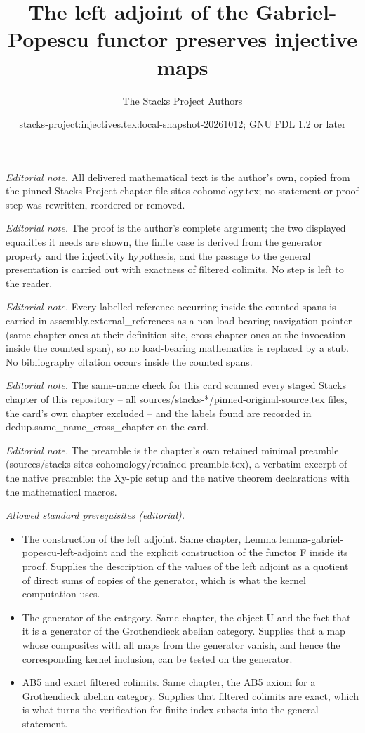 \documentclass[10pt,a4paper]{amsart}
\title{The left adjoint of the Gabriel-Popescu functor preserves injective maps}
\author{The Stacks Project Authors}
\date{stacks-project:injectives.tex:local-snapshot-20261012; GNU FDL 1.2 or later}
\theoremstyle{plain}
\theoremstyle{definition}
\theoremstyle{remark}
\numberwithin{equation}{subsection}
\begin{document}
\maketitle
\noindent\textit{Editorial note.} All delivered mathematical text is the author's own, copied from the pinned Stacks Project chapter file sites-cohomology.tex; no statement or proof step was rewritten, reordered or removed.\par\medskip
\noindent\textit{Editorial note.} The proof is the author's complete argument; the two displayed equalities it needs are shown, the finite case is derived from the generator property and the injectivity hypothesis, and the passage to the general presentation is carried out with exactness of filtered colimits. No step is left to the reader.\par\medskip
\noindent\textit{Editorial note.} Every labelled reference occurring inside the counted spans is carried in assembly.external\_references as a non-load-bearing navigation pointer (same-chapter ones at their definition site, cross-chapter ones at the invocation inside the counted span), so no load-bearing mathematics is replaced by a stub. No bibliography citation occurs inside the counted spans.\par\medskip
\noindent\textit{Editorial note.} The same-name check for this card scanned every staged Stacks chapter of this repository -- all sources/stacks-*/pinned-original-source.tex files, the card's own chapter excluded -- and the labels found are recorded in dedup.same\_name\_cross\_chapter on the card.\par\medskip
\noindent\textit{Editorial note.} The preamble is the chapter's own retained minimal preamble (sources/stacks-sites-cohomology/retained-preamble.tex), a verbatim excerpt of the native preamble: the Xy-pic setup and the native theorem declarations with the mathematical macros.\par\medskip
\noindent\textit{Allowed standard prerequisites (editorial).}\begin{itemize}
\item The construction of the left adjoint. Same chapter, Lemma lemma-gabriel-popescu-left-adjoint and the explicit construction of the functor F inside its proof. Supplies the description of the values of the left adjoint as a quotient of direct sums of copies of the generator, which is what the kernel computation uses.
\item The generator of the category. Same chapter, the object U and the fact that it is a generator of the Grothendieck abelian category. Supplies that a map whose composites with all maps from the generator vanish, and hence the corresponding kernel inclusion, can be tested on the generator.
\item AB5 and exact filtered colimits. Same chapter, the AB5 axiom for a Grothendieck abelian category. Supplies that filtered colimits are exact, which is what turns the verification for finite index subsets into the general statement.
\end{itemize}\medskip
\end{document}
